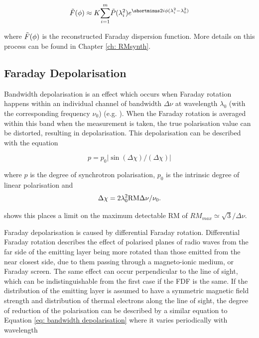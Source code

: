 \begin{equation}
    \Tilde{F}(\phi) \approx K \overset{m}{\underset{i=1}{\sum}}\Tilde{P}(\lambda_i^2)e^{\shortminus2i\phi(\lambda_i^2-\lambda_0^2)}    \label{eq: discrete rm synth}
\end{equation}

\noindent where $\Tilde{F}(\phi)$ is the reconstructed Faraday dispersion function. More details on this process can be found in Chapter \ref{ch: RMsynth}.

\subsection{Faraday Depolarisation}

Bandwidth depolarisation is an effect which occurs when Faraday rotation happens within an individual channel of bandwidth $\Delta\nu$ at wavelength $\lambda_0$ (with the corresponding frequency $\nu_0$) (e.g. \cite{Beck_cosmic}). When the Faraday rotation is averaged within this band when the measurement is taken, the true polarisation value can be distorted, resulting in depolarisation. This depolarisation can be described with the equation

\begin{equation}
    p = p_0 |\sin(\Delta\chi)/(\Delta\chi)|
    \label{eq: bandwidth depolarisation}
\end{equation}

\noindent where $p$ is the degree of synchrotron polarisation, $p_0$ is the intrinsic degree of linear polarisation and 
\begin{equation}
   \Delta\chi = 2\lambda_0^2{\rm{RM}}\Delta\nu/\nu_0.
   \label{eq: deltachi}
\end{equation}


\noindent \cite{Beck_cosmic} shows this places a limit on the maximum detectable RM of $RM_{max} \simeq \sqrt{3}/\Delta\nu$. 

Faraday depolarisation is caused by differential Faraday rotation. Differential Faraday rotation describes the effect of polarised planes of radio waves from the far side of the emitting layer being more rotated than those emitted from the near closest side, due to them passing through a magneto-ionic medium, or Faraday screen. The same effect can occur perpendicular to the line of sight, which can be indistinguishable from the first case if the FDF is the same. If the distribution of the emitting layer is assumed to have a symmetric magnetic field strength and distribution of thermal electrons along the line of sight, the degree of reduction of the polarisation can be described by a similar equation to Equation \ref{eq: bandwidth depolarisation} where it varies periodically with wavelength

